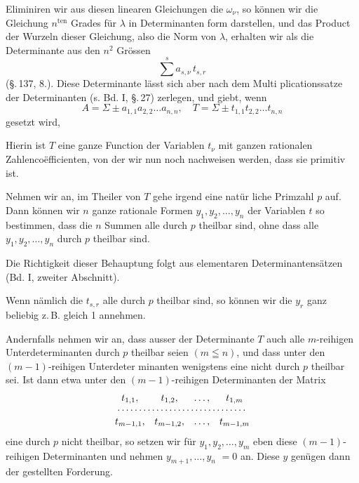 
Eliminiren wir aus diesen linearen Gleichungen die $\omega_\nu$, so
können wir die Gleichung $n^{\text{ten}}$ Grades für $\lambda$ in Determinanten\-
form darstellen, und das Product der Wurzeln dieser Gleichung,
also die Norm von $\lambda$, erhalten wir als die Determinante aus
den $n^2$ Grössen
\[
\sum^{s} a_{s,\nu}\,t_{s,r}
\]
(\S.\,137, 8.). Diese Determinante lässt sich aber nach dem Multi\-
plicationssatze der Determinanten (s. Bd. I, \S.\,27) zerlegen, und
giebt, wenn
\[
A = \Sigma \pm a_{1,1}a_{2,2}\ldots a_{n,n}, \quad T = \Sigma \pm t_{1,1}t_{2,2}\ldots t_{n,n}
\]
gesetzt wird,

Hierin ist $T$ eine ganze Function der Variablen $t_\nu$ mit ganzen
rationalen Zahlenco\"efficienten, von der wir nun noch nachweisen
werden, dass sie primitiv ist.

Nehmen wir an, im Theiler von $T$ gehe irgend eine natür\-
liche Primzahl $p$ auf. Dann können wir $n$ ganze rationale
Formen $y_1, y_2, \ldots, y_n$ der Variablen $t$ so bestimmen, dass die
$n$ Summen
alle durch $p$ theilbar sind, ohne dass alle $y_1, y_2, \ldots, y_n$ durch $p$
theilbar sind.

Die Richtigkeit dieser Behauptung folgt aus elementaren
Determinantensätzen (Bd. I, zweiter Abschnitt).

Wenn nämlich die $t_{s,r}$ alle durch $p$ theilbar sind, so können
wir die $y_r$ ganz beliebig z.\,B. gleich 1 annehmen.

Andernfalls nehmen wir an, dass ausser der Determinante $T$
auch alle $m$-reihigen Unterdeterminanten durch $p$ theilbar seien
$(m \leqq n)$,
und dass unter den $(m-1)$-reihigen Unterdeter\-
minanten wenigstens eine nicht durch $p$ theilbar sei. Ist dann
etwa unter den $(m-1)$-reihigen Determinanten der Matrix
\[
\begin{array}{cccc}
t_{1,1}, & t_{1,2}, & \ldots, & t_{1,m} \\
\multicolumn{4}{c}{\cdots\cdots\cdots\cdots\cdots\cdots\cdots\cdots\cdots\cdots} \\
t_{m-1,1}, & t_{m-1,2}, & \ldots, & t_{m-1,m}
\end{array}
\]
eine durch $p$ nicht theilbar, so setzen wir für $y_1, y_2, \ldots, y_m$ eben
diese $(m-1)$-reihigen Determinanten und nehmen $y_{m+1}, \ldots, y_n$
$= 0$ an. Diese $y$ genügen dann der gestellten Forderung.
